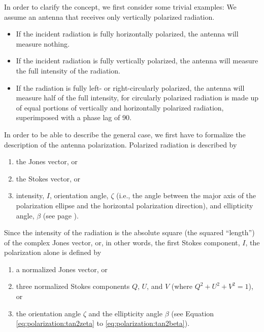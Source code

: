 In order to clarify the concept, we first consider some trivial examples:
We assume an antenna that receives only vertically polarized
radiation.
\begin{itemize}
\item If the incident radiation is fully horizontally polarized, the
  antenna will measure nothing.
\item If the incident radiation is fully vertically polarized, the
  antenna will measure the full intensity of the radiation.
\item If the radiation is fully left- or right-circularly polarized,
  the antenna will measure half of the full intensity, for circularly
  polarized radiation is made up of equal portions of vertically and
  horizontally polarized radiation, superimposed with a phase lag of
  90\degree.
\end{itemize}

In order to be able to describe the general case, we first have to
formalize the description of the antenna polarization.  Polarized
radiation is described by
\begin{enumerate}
\item 
the Jones vector, or 
\item the Stokes
vector, or
\item intensity, $I$, orientation angle, $\zeta$
(i.e., the angle between the major axis of the polarization ellipse and
the horizontal polarization direction), %
and ellipticity angle, $\beta$ (see
page \pageref{def:ellipticity-angle}).
\end{enumerate}
Since the intensity of the
radiation is the absolute square (the squared ``length'') of the
complex Jones vector, or, in other words, the first Stokes component,
$I$, the polarization alone is defined by
\begin{enumerate}
\item a normalized Jones
vector, or
\item three normalized Stokes components $Q$, $U$, and $V$
(where $Q^2 + U^2 + V^2 = 1$), or 
\item the orientation angle $\zeta$
and the ellipticity angle $\beta$ (see
Equation \ref{eq:polarization:tan2zeta} to \ref{eq:polarization:tan2beta}).
\end{enumerate}


